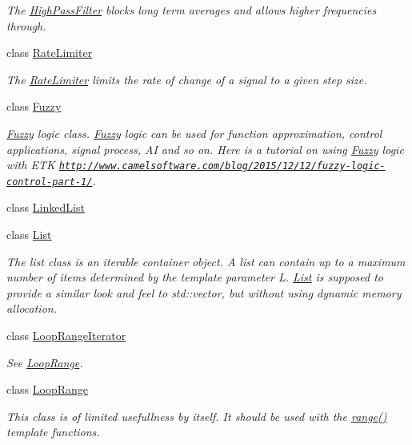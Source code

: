 \begin{DoxyCompactItemize}
\begin{DoxyCompactList}\small\item\em The \hyperlink{classetk_1_1_high_pass_filter}{High\-Pass\-Filter} blocks long term averages and allows higher frequencies through. \end{DoxyCompactList}\item 
class \hyperlink{classetk_1_1_rate_limiter}{Rate\-Limiter}
\begin{DoxyCompactList}\small\item\em The \hyperlink{classetk_1_1_rate_limiter}{Rate\-Limiter} limits the rate of change of a signal to a given step size. \end{DoxyCompactList}\item 
class \hyperlink{classetk_1_1_fuzzy}{Fuzzy}
\begin{DoxyCompactList}\small\item\em \hyperlink{classetk_1_1_fuzzy}{Fuzzy} logic class. \hyperlink{classetk_1_1_fuzzy}{Fuzzy} logic can be used for function approximation, control applications, signal process, A\-I and so on. Here is a tutorial on using \hyperlink{classetk_1_1_fuzzy}{Fuzzy} logic with E\-T\-K \href{http://www.camelsoftware.com/blog/2015/12/12/fuzzy-logic-control-part-1/}{\tt http\-://www.\-camelsoftware.\-com/blog/2015/12/12/fuzzy-\/logic-\/control-\/part-\/1/}. \end{DoxyCompactList}\item 
class \hyperlink{classetk_1_1_linked_list}{Linked\-List}
\item 
class \hyperlink{classetk_1_1_list}{List}
\begin{DoxyCompactList}\small\item\em The list class is an iterable container object. A list can contain up to a maximum number of items determined by the template parameter L. \hyperlink{classetk_1_1_list}{List} is supposed to provide a similar look and feel to std\-::vector, but without using dynamic memory allocation. \end{DoxyCompactList}\item 
class \hyperlink{classetk_1_1_loop_range_iterator}{Loop\-Range\-Iterator}
\begin{DoxyCompactList}\small\item\em See \hyperlink{classetk_1_1_loop_range}{Loop\-Range}. \end{DoxyCompactList}\item 
class \hyperlink{classetk_1_1_loop_range}{Loop\-Range}
\begin{DoxyCompactList}\small\item\em This class is of limited usefullness by itself. It should be used with the \hyperlink{namespaceetk_aff39b0f367ee4d947e2e7d297ffd506b}{range()} template functions. \end{DoxyCompactList}\item 

\end{DoxyCompactItemize}
